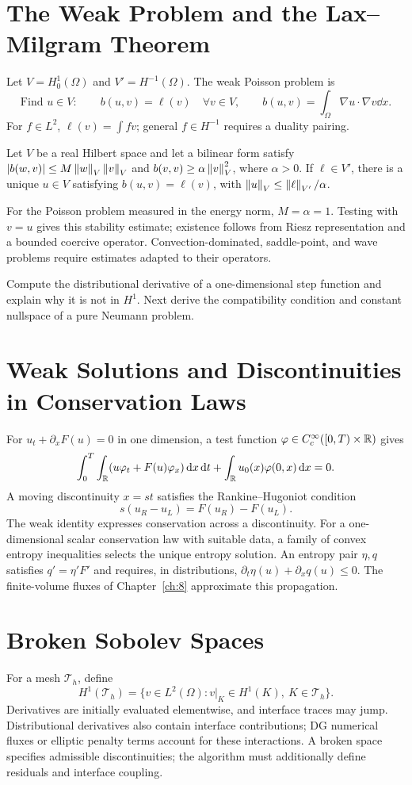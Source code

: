\section{The Weak Problem and the Lax--Milgram Theorem}
Let $V=H_0^1(\Omega)$ and $V'=H^{-1}(\Omega)$. The weak Poisson problem is
\[
\text{Find }u\in V:\qquad b(u,v)=\ell(v)\quad\forall v\in V,\qquad
b(u,v)=\int_\Omega\nabla u\cdot\nabla v\dd x.
\]
For $f\in L^2$, $\ell(v)=\int fv$; general $f\in H^{-1}$ requires a duality pairing.
\begin{theorem}
Let $V$ be a real Hilbert space and let a bilinear form satisfy
$|b(w,v)|\le M\left\lVert w\right\rVert_V\left\lVert v\right\rVert_V$ and
$b(v,v)\ge\alpha\left\lVert v\right\rVert_V^2$, where $\alpha>0$.
If $\ell\in V'$, there is a unique $u\in V$ satisfying $b(u,v)=\ell(v)$, with
$\left\lVert u\right\rVert_V\le\left\lVert\ell\right\rVert_{V'}/\alpha$.
\end{theorem}
For the Poisson problem measured in the energy norm, $M=\alpha=1$.
Testing with $v=u$ gives this stability estimate; existence follows from Riesz representation and a bounded coercive operator.
Convection-dominated, saddle-point, and wave problems require estimates adapted to their operators.

{Compute the distributional derivative of a one-dimensional step function and explain why it is not in $H^1$. Next derive the compatibility condition and constant nullspace of a pure Neumann problem.}

\section{Weak Solutions and Discontinuities in Conservation Laws}
For $u_t+\partial_xF(u)=0$ in one dimension, a test function
$\varphi\in C_c^\infty([0,T)\times\mathbb R)$ gives
\[
\int_0^T\int_\mathbb R(u\varphi_t+F(u)\varphi_x)\,\mathrm d x\,\mathrm d t
+\int_\mathbb R u_0(x)\varphi(0,x)\,\mathrm d x=0.
\]
A moving discontinuity $x=s t$ satisfies the Rankine--Hugoniot condition
\[
s(u_R-u_L)=F(u_R)-F(u_L).
\]
The weak identity expresses conservation across a discontinuity. For a one-dimensional scalar conservation law with suitable data, a family of convex entropy inequalities selects the unique entropy solution.
An entropy pair $\eta,q$ satisfies $q'=\eta'F'$ and requires, in distributions,
$\partial_t\eta(u)+\partial_xq(u)\le0$. The finite-volume fluxes of Chapter~\ref{ch:8} approximate this propagation.

\section{Broken Sobolev Spaces}
For a mesh $\mathcal T_h$, define
\[
H^1(\mathcal T_h)=\{v\in L^2(\Omega):v|_K\in H^1(K),\ K\in\mathcal T_h\}.
\]
Derivatives are initially evaluated elementwise, and interface traces may jump. Distributional derivatives also contain interface contributions;
DG numerical fluxes or elliptic penalty terms account for these interactions.
A broken space specifies admissible discontinuities; the algorithm must additionally define residuals and interface coupling.
